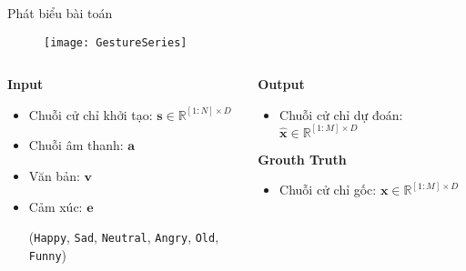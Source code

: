 \begin{frame}{Phát biểu bài toán}
	
	
	\begin{figure}[h]
		\centering
		\texttt{[image: GestureSeries]}
	\end{figure}
	
	\vspace{-10pt}
	
	\begin{columns}
		
		\begin{column}{0.6\textwidth}
			
			\textbf{Input}
			\begin{itemize}
				\item Chuỗi cử chỉ khởi tạo: $\mathbf{s} \in \mathbb{R}^{[1:N] \times D}$
				\item Chuỗi âm thanh: $\mathbf{a}$
				\item Văn bản: $\mathbf{v}$ 
				\item Cảm xúc: $\mathbf{e}$ 
				
				{\small
					(\texttt{Happy},  \texttt{Sad},  \texttt{Neutral}, \texttt{Angry}, \texttt{Old}, \texttt{Funny})
				}
				
				
			\end{itemize}
			
		\end{column}
		\begin{column}{0.4\textwidth}
			\textbf{Output}
			\begin{itemize}
				\item Chuỗi cử chỉ dự đoán: $\hat{\mathbf{x}} \in \mathbb{R}^{[1:M] \times D}$
			\end{itemize}
			
			\textbf{Grouth Truth}
			\begin{itemize}
				\item Chuỗi cử chỉ gốc: $ \mathbf{x}  \in \mathbb{R}^{[1:M] \times D}$
			\end{itemize}
		\end{column}
	\end{columns}
	
\end{frame}

